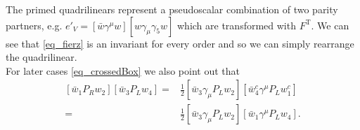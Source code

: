 The primed quadrilinears represent a pseudoscalar combination of two parity partners, e.g. $e'_V = \left[\bar w\gamma^\mu w\right]\left[w\gamma_\mu\gamma_5w\right]$
which are transformed with $F^\text{T}$. We can see that \eqref{eq_fierz} is an invariant for every order and so we can simply rearrange the quadrilinear.
\\ \noindent For later cases \eqref{eq_crossedBox} we also point out that 
\begin{subequations}
\begin{align}
 \left[\bar w_1 P_R w_2\right]\left[\bar w_3 P_L w_4\right] =& \frac12  \left[\bar w_3 \gamma_\mu P_L w_2\right]\left[\bar w^c_4 \gamma^\mu P_L w_1^c\right]\\
 =& \frac12  \left[\bar w_3 \gamma_\mu P_L w_2\right]\left[\bar w_1 \gamma^\mu P_L w_4\right].
 \label{eq_fierzSPtoVA}
\end{align} 
\end{subequations}

